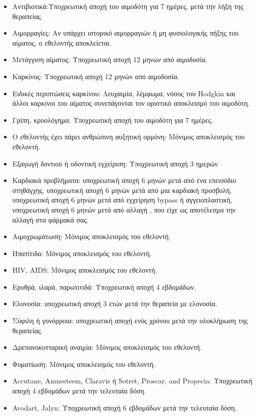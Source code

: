 	\begin{itemize}
			
		\item Αντιβιοτικά:Υποχρεωτική αποχή του αιμοδότη για 7 ημέρες, μετά την λήξη της θεραπείας.
	
		\item Αιμορραγίες: Αν υπάρχει ιστορικό αιμορραγιών ή μη φυσιολογικής πήξης του αίματος, ο εθελοντής αποκλείεται.
		\item Μετάγγιση αίματος: Υποχρεωτική αποχή 12 μηνών από αιμοδοσία.
		\item Καρκίνος: Υποχρεωτική αποχή 12 μηνών από αιμοδοσία.
		\item Ειδικές περιπτώσεις καρκίνου: Λευχαιμία, λέμφωμα, νόσος του Hodgkin και άλλοι καρκίνοι του αίματος συνεπάγονται τον οριστικό αποκλεισμό του αιμοδότη. 
		\item Γρίπη, κρυολόγημα: Υποχρεωτική αποχή του αιμοδότη για 7 ημέρες.
		\item Ο εθελοντής έχει πάρει ανθρώπινη αυξητική ορμόνη: Μόνιμος αποκλεισμός του εθελοντή.
		\item Εξαγωγή δοντιού ή οδοντική εγχείριση: Υποχρεωτική αποχή 3 ημερών
		\item Καρδιακά προβλήματα: υποχρεωτική αποχή 6 μηνών μετά από ένα επεισόδιο στηθάγχης, υποχρεωτική αποχή 6 μηνών μετά από μια καρδιακή προσβολή, υποχρεωτική αποχή 6 μηνών μετά από εγχείρηση bypass ή αγγειοπλαστική, υποχρεωτική αποχή 6 μηνών μετά από αλλαγή , που είχε ως αποτέλεσμα την αλλαγή στα φάρμακά σας.
		\item Aιμοχρωμάτωση: Μόνιμος αποκλεισμός του εθελοντή. 
		\item Ηπατίτιδα:  Μόνιμος αποκλεισμός του εθελοντή. 
		\item HIV, AIDS:  Μόνιμος αποκλεισμός του εθελοντή. 
		\item Ερυθρά, ιλαρά, παρωτιτιδά: Υποχρεωτική αποχή 4 εβδομάδων.
		\item Ελονοσία: υποχρεωτική αποχή 3 ετών μετά την θεραπεία με ελονοσία.
		\item Σύφιλη ή γονόρροια: υποχρεωτική αποχή ενός χρόνου μετά την ολοκλήρωση της θεραπείας.
		\item Δρεπανοκυτταρική αναιμία: Μόνιμος αποκλεισμός του εθελοντή. 
		\item Φυματίωση: Μόνιμος αποκλεισμός του εθελοντή. 
		\item Accutane, Amnesteem, Claravis ή Sotret, Proscar, and Propecia: Υποχρεωτική αποχή 4 εβδομάδων μετά την τελευταία δόση.
		\item Avodart, Jalyn: Υποχρεωτική αποχή 6 εβδομάδων μετά την τελευταία δόση.

\end{itemize}
